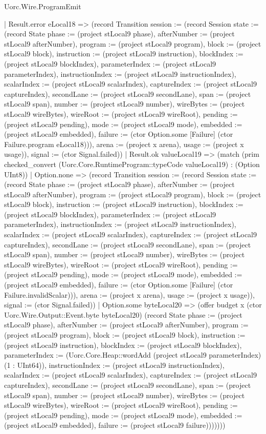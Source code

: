 \begin{lexlean}{Uorc.Wire.ProgramEmit}
\begin{semanticmodule}
{            | Result.error eLocal18 => (record Transition {session := (record Session {state := (record State {phase := (project stLocal9 phase), afterNumber := (project stLocal9 afterNumber), program := (project stLocal9 program), block := (project stLocal9 block), instruction := (project stLocal9 instruction), blockIndex := (project stLocal9 blockIndex), parameterIndex := (project stLocal9 parameterIndex), instructionIndex := (project stLocal9 instructionIndex), scalarIndex := (project stLocal9 scalarIndex), captureIndex := (project stLocal9 captureIndex), secondLane := (project stLocal9 secondLane), span := (project stLocal9 span), number := (project stLocal9 number), wireBytes := (project stLocal9 wireBytes), wireRoot := (project stLocal9 wireRoot), pending := (project stLocal9 pending), mode := (project stLocal9 mode), embedded := (project stLocal9 embedded), failure := (ctor Option.some [Failure] (ctor Failure.program eLocal18))}), arena := (project x arena), usage := (project x usage)}), signal := (ctor Signal.failed)})
            | Result.ok valueLocal19 => (match (prim checked_convert (Uorc.Core.RuntimeProgram::typeCode valueLocal19) : (Option UInt8))
              | Option.none => (record Transition {session := (record Session {state := (record State {phase := (project stLocal9 phase), afterNumber := (project stLocal9 afterNumber), program := (project stLocal9 program), block := (project stLocal9 block), instruction := (project stLocal9 instruction), blockIndex := (project stLocal9 blockIndex), parameterIndex := (project stLocal9 parameterIndex), instructionIndex := (project stLocal9 instructionIndex), scalarIndex := (project stLocal9 scalarIndex), captureIndex := (project stLocal9 captureIndex), secondLane := (project stLocal9 secondLane), span := (project stLocal9 span), number := (project stLocal9 number), wireBytes := (project stLocal9 wireBytes), wireRoot := (project stLocal9 wireRoot), pending := (project stLocal9 pending), mode := (project stLocal9 mode), embedded := (project stLocal9 embedded), failure := (ctor Option.some [Failure] (ctor Failure.invalidScalar))}), arena := (project x arena), usage := (project x usage)}), signal := (ctor Signal.failed)})
              | Option.some byteLocal20 => (offer budget x (ctor Uorc.Wire.Output::Event.byte byteLocal20) (record State {phase := (project stLocal9 phase), afterNumber := (project stLocal9 afterNumber), program := (project stLocal9 program), block := (project stLocal9 block), instruction := (project stLocal9 instruction), blockIndex := (project stLocal9 blockIndex), parameterIndex := (Uorc.Core.Heap::wordAdd (project stLocal9 parameterIndex) (1 : UInt64)), instructionIndex := (project stLocal9 instructionIndex), scalarIndex := (project stLocal9 scalarIndex), captureIndex := (project stLocal9 captureIndex), secondLane := (project stLocal9 secondLane), span := (project stLocal9 span), number := (project stLocal9 number), wireBytes := (project stLocal9 wireBytes), wireRoot := (project stLocal9 wireRoot), pending := (project stLocal9 pending), mode := (project stLocal9 mode), embedded := (project stLocal9 embedded), failure := (project stLocal9 failure)}))))))
}
\end{semanticmodule}
\end{lexlean}
